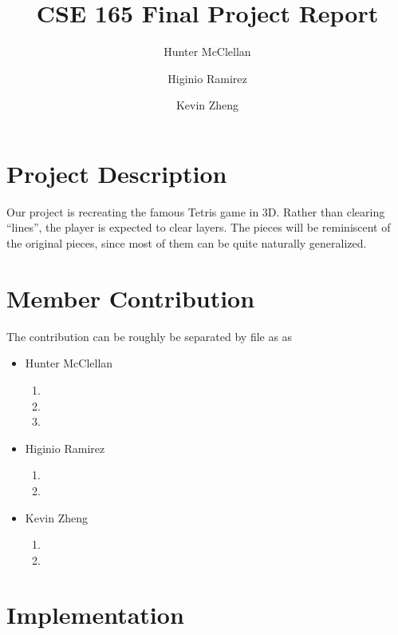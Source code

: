 \documentclass[letterpaper, 12pt]{article}
\title{CSE 165 Final Project Report}
\author{Hunter McClellan \and Higinio Ramirez \and Kevin Zheng}
\begin{document}
\maketitle
\section{Project Description}
Our project is recreating the famous Tetris game in 3D.
Rather than clearing ``lines'', the player is expected to clear layers.
The pieces will be reminiscent of the original pieces, since most of them can be quite naturally generalized.
\section{Member Contribution}
The contribution can be roughly be separated by file as as
\begin{multicols}{3}

\begin{itemize}
    \item Hunter McClellan
        \begin{enumerate}
            \item {}
            \item {}
            \item {}
        \end{enumerate}
    \columnbreak
    \item Higinio Ramirez
        \begin{enumerate}
            \item {}
            \item {}
        \end{enumerate}
    \columnbreak
    \item Kevin Zheng
        \begin{enumerate}
            \item {}
            \item {}
        \end{enumerate}
\end{itemize}
\end{multicols}
\section{Implementation}
\end{document}

